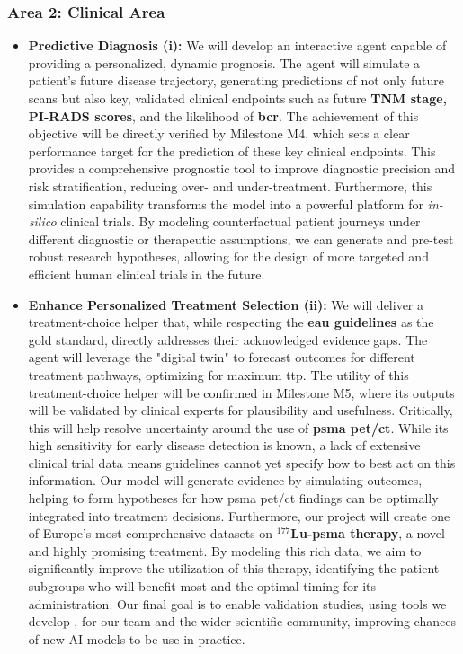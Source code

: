 \documentclass[11pt, a4paper]{article}
\begin{document}
\subsubsection*{Area 2: Clinical Area}
\begin{itemize}
    \item \textbf{Predictive Diagnosis  (i):} We will develop an interactive agent capable of providing a personalized, dynamic prognosis. The agent will simulate a patient's future disease trajectory, generating predictions of not only future scans but also key, validated clinical endpoints such as future \textbf{TNM stage, PI-RADS scores}, and the likelihood of \textbf{\gls{bcr}}. The achievement of this objective will be directly verified by Milestone M4, which sets a clear performance target for the prediction of these key clinical endpoints. This provides a comprehensive prognostic tool to improve diagnostic precision and risk stratification, reducing over- and under-treatment. Furthermore, this simulation capability transforms the model into a powerful platform for \textit{in-silico} clinical trials. By modeling counterfactual patient journeys under different diagnostic or therapeutic assumptions, we can generate and pre-test robust research hypotheses, allowing for the design of more targeted and efficient human clinical trials in the future.

    \item \textbf{Enhance Personalized Treatment Selection (ii):} We will deliver a treatment-choice helper that, while respecting the \textbf{\gls{eau} guidelines} as the gold standard, directly addresses their acknowledged evidence gaps. The agent will leverage the "digital twin" to forecast outcomes for different treatment pathways, optimizing for maximum \gls{ttp}. The utility of this treatment-choice helper will be confirmed in Milestone M5, where its outputs will be validated by clinical experts for plausibility and usefulness. Critically, this will help resolve uncertainty around the use of \textbf{\gls{psma} \gls{pet}/\gls{ct}}. While its high sensitivity for early disease detection is known, a lack of extensive clinical trial data means guidelines cannot yet specify how to best act on this information. Our model will generate evidence by simulating outcomes, helping to form hypotheses for how \gls{psma} \gls{pet}/\gls{ct} findings can be optimally integrated into treatment decisions. Furthermore, our project will create one of Europe's most comprehensive datasets on \textbf{$^{177}$Lu-\gls{psma} therapy}, a novel and highly promising treatment. By modeling this rich data, we aim to significantly improve the utilization of this therapy, identifying the patient subgroups who will benefit most and the optimal timing for its administration. Our final goal is to enable validation studies, using tools we develop , for our team and the wider scientific community, improving chances of new AI models to be use in practice. 
\end{itemize}
\end{document}
